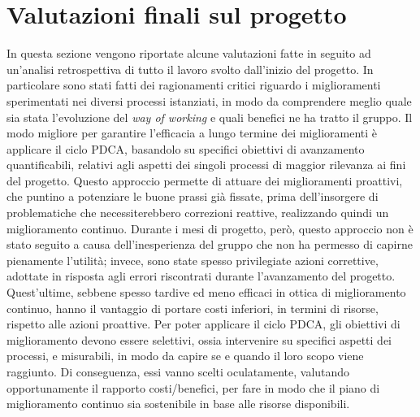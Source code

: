 
\section{Valutazioni finali sul progetto}
	In questa sezione vengono riportate alcune valutazioni fatte in seguito ad un'analisi retrospettiva di tutto il lavoro svolto dall'inizio del progetto. In particolare sono stati fatti dei ragionamenti critici riguardo i miglioramenti sperimentati nei diversi processi istanziati, in modo da comprendere meglio quale sia stata l'evoluzione del \textit{way of working} e quali benefici ne ha tratto il gruppo.
	\newline\newline
	Il modo migliore per garantire l'efficacia a lungo termine dei miglioramenti è applicare il ciclo PDCA, basandolo su specifici obiettivi di avanzamento quantificabili, relativi agli aspetti dei singoli processi di maggior rilevanza ai fini del progetto. Questo approccio permette di attuare dei miglioramenti proattivi, che puntino a potenziare le buone prassi già fissate, prima dell'insorgere di problematiche che necessiterebbero correzioni reattive, realizzando quindi un miglioramento continuo.
	\newline
	Durante i mesi di progetto, però, questo approccio non è stato seguito a causa dell'inesperienza del gruppo che non ha permesso di capirne pienamente l'utilità; invece, sono state spesso privilegiate azioni correttive, adottate in risposta agli errori riscontrati durante l'avanzamento del progetto. Quest'ultime, sebbene spesso tardive ed meno efficaci in ottica di miglioramento continuo, hanno il vantaggio di portare costi inferiori, in termini di risorse, rispetto alle azioni proattive.
	\newline
	Per poter applicare il ciclo PDCA, gli obiettivi di miglioramento devono essere selettivi, ossia intervenire su specifici aspetti dei processi, e misurabili, in modo da capire se e quando il loro scopo viene raggiunto. Di conseguenza, essi vanno scelti oculatamente, valutando opportunamente il rapporto costi/benefici, per fare in modo che il piano di miglioramento continuo sia sostenibile in base alle risorse disponibili.
